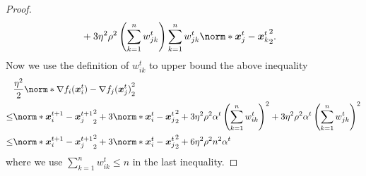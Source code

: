 \documentclass{article}
\begin{document}
\begin{proof}
\begin{align*}
    & +3\eta^2\rho^2 \left(\sum_{k=1}^n w^t_{jk}\right)
    \sum_{k=1}^n w^t_{jk} \norm*{ \xx^t_j - \xx^t_k }_2^2.
  \end{align*}
  Now we use the definition of $w_{ik}^t$ to upper bound the above inequality
  \begin{equation} \label{eq:lower-bound:1}
    \begin{split}
    &\frac{\eta^2}{2} \norm*{\nabla f_i(\xx^t_i) - \nabla f_j(\xx^t_j)}_2^2\\
    \le& 
    \norm*{\xx_i^{t+1} - \xx_j^{t+1}}_2^2 
    + 3\norm*{\xx_i^t - \xx_j^t}_2^2
    + 3\eta^2\rho^2\alpha^t \left(\sum_{k=1}^n w^t_{ik}\right)^2
    + 3\eta^2\rho^2\alpha^t \left(\sum_{k=1}^n w^t_{jk}\right)^2 \\
    \le& 
    \norm*{\xx_i^{t+1} - \xx_j^{t+1}}_2^2 
    + 3\norm*{\xx_i^t - \xx_j^t}_2^2
    + 6\eta^2\rho^2n^2\alpha^t
  \end{split}
\end{equation}
  where we use $\sum_{k=1}^n w_{ik}^t \le n $ in the last inequality.
  

\end{proof}
\end{document}
